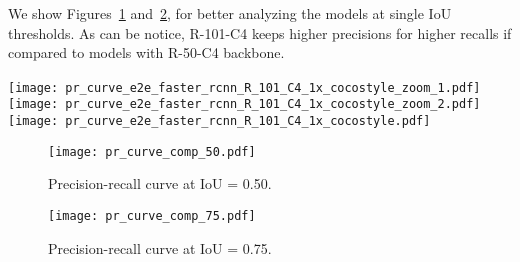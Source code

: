 We show Figures~\ref{fig:prec-rec_curve_50} and~\ref{fig:prec-rec_curve_75}, for better analyzing the models at single IoU thresholds.
As can be notice, R-101-C4 keeps higher precisions for higher recalls if compared to models with R-50-C4 backbone.
%
\begin{figure*}[htb!]
	\centering
	\texttt{[image: pr\_curve\_e2e\_faster\_rcnn\_R\_101\_C4\_1x\_cocostyle\_zoom\_1.pdf]}~
	\texttt{[image: pr\_curve\_e2e\_faster\_rcnn\_R\_101\_C4\_1x\_cocostyle\_zoom\_2.pdf]}\\
	\vspace{2mm}
	\texttt{[image: pr\_curve\_e2e\_faster\_rcnn\_R\_101\_C4\_1x\_cocostyle.pdf]}
	\caption{Precision-recall curve for R-101-C4 at various IoUs.}
	\label{fig:pr_R101C4}
\end{figure*}
%
%
\begin{figure}[htb!]
	\centering
	\texttt{[image: pr\_curve\_comp\_50.pdf]}
	\caption{Precision-recall curve at IoU = 0.50.}
	\label{fig:prec-rec_curve_50}
\end{figure}
%
\begin{figure}[htb!]
	\centering
	\texttt{[image: pr\_curve\_comp\_75.pdf]}
	\caption{Precision-recall curve at IoU = 0.75.}
	\label{fig:prec-rec_curve_75}
\end{figure}


